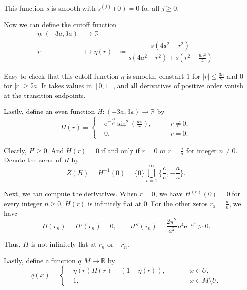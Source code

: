 \documentclass[reqno,11pt]{article}
\theoremstyle{definition}
\theoremstyle{remark}
\numberwithin{equation}{section}
\begin{document}
This function $s$ is smooth with $s^{(j)}(0)=0$ for all $j\ge 0$.

Now we can define the cutoff function
\begin{equation}
	\begin{aligned}
		\eta:(-3a,3a) & \longrightarrow \mathbb{R} &                                                                  \\
		r             & \longmapsto \eta(r)        & \coloneq \dfrac{s(4a^2-r^2)}{s(4a^2-r^2)+s(r^2-\frac{9a^2}{4})}.
	\end{aligned}
\end{equation}

Easy to check that this cutoff function $\eta$ is smooth, constant $1$ for $|r|\le \frac{3a}{2}$ and $0$ for $|r|\geq 2a$. It takes values in $[0,1]$, and all derivatives of positive order vanish at the transition endpoints.

Lastly, define an even function $H:(-3a,3a)\to \mathbb{R}$ by
\begin{equation}
	H(r)=\left\{
	\begin{aligned}
		 & \mathrm{e}^{-\frac{a^2}{r^2}}\sin^{2}\left(\frac{a\pi}{r}\right),\qquad & r\neq 0, \\
		 & 0,\qquad                                                                & r=0.
	\end{aligned}
	\right.
\end{equation}

Clearly, $H\geq 0$. And $H(r)=0$ if and only if $r=0$ or $r=\frac{a}{n}$ for integer $n\neq 0$. Denote the zeros of $H$ by
\begin{displaymath}
	Z(H)=H^{-1}(0)=\{0\}\bigcup_{n=1}^{\infty}\{\frac{a}{n},-\frac{a}{n}\}.
\end{displaymath}

Next, we can compute the derivatives. When $r=0$, we have $H^{(n)}(0)=0$ for every integer $n\ge 0$, $H(r)$ is infinitely flat at $0$. For the other zeros $r_n=\frac{a}{n}$, we have
\begin{displaymath}
	H(r_n)=H'(r_n)=0;\qquad H''(r_n)=\frac{2\pi^2}{a^2} n^4\mathrm{e}^{-n^2}>0.
\end{displaymath}

Thus, $H$ is not infinitely flat at $r_n$ or $-r_n$.

Lastly, define a function $q:M\to \mathbb{R}$ by
\begin{displaymath}
	q(x)=\left\{
	\begin{aligned}
		 & \eta(r)H(r)+(1-\eta(r)),\qquad &  & x\in U,            \\
		 & 1,\qquad                       &  & x\in M\setminus U.
	\end{aligned}
	\right.
\end{displaymath}
\end{document}
